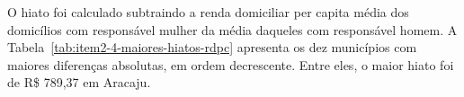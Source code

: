 O hiato foi calculado subtraindo a renda domiciliar per capita média dos domicílios com responsável mulher da média daqueles com responsável homem. A Tabela~\ref{tab:item2-4-maiores-hiatos-rdpc} apresenta os dez municípios com maiores diferenças absolutas, em ordem decrescente. Entre eles, o maior hiato foi de R\$ 789,37 em Aracaju.
